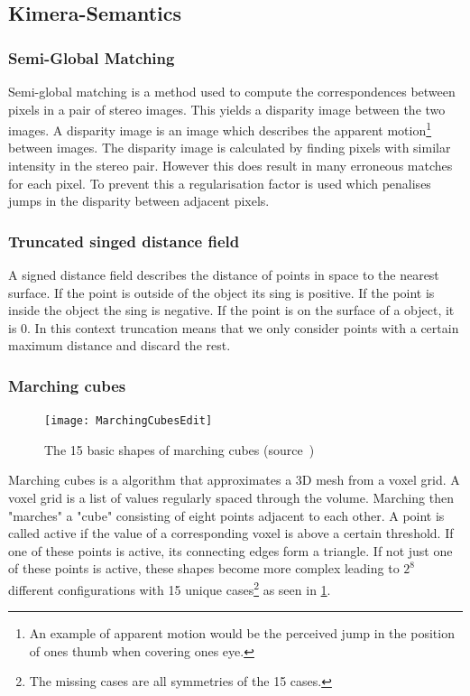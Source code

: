 \documentclass[11pt,a4paper]{article}
\begin{document}
\subsection{Kimera-Semantics}
\subsubsection{Semi-Global Matching} \label{pre:semi-global matching}
Semi-global matching is a method used  to compute the correspondences between pixels in a pair of stereo images. 
This yields a disparity image between the two images. 
A disparity image is an image which describes the apparent motion\footnote{An example of apparent motion would be the perceived jump in the position of ones thumb when covering ones eye.} between images.
The disparity image is calculated by finding pixels with similar intensity in the stereo pair. 
However this does result in many erroneous matches for each pixel. 
To prevent this a regularisation factor is used which penalises jumps in the disparity between adjacent pixels.
\subsubsection{Truncated singed distance field} \label{pre:TSDF}
A signed distance field describes the distance of points in space to the nearest surface.
If the point is outside of the object its sing is positive.
If the point is inside the object the sing is negative. 
If the point is on the surface of a object, it is 0. 
In this context truncation means that we only consider points with a certain maximum distance and discard the rest. 
\subsubsection{Marching cubes} \label{pre:marching cubes} 
\begin{figure}
  \centering
  \texttt{[image: MarchingCubesEdit]}
  \caption{The 15 basic shapes of marching cubes (source~\cite{marchingCubesImage})}\label{Fig:Marching cubes}  
\end{figure}
Marching cubes is a algorithm that approximates a 3D mesh from a voxel grid. 
A voxel grid is a list of values regularly spaced through the volume. 
Marching then "marches" a "cube" consisting of eight  points adjacent to each other.
A point is called active if the value of a corresponding voxel is above a certain threshold.
If one of these points is active, its connecting edges form a triangle. 
If not just one of these points is active, these shapes become more complex leading to $2^8$ different configurations with 15 unique cases\footnote{The missing cases are all symmetries of the 15 cases.} as seen in \ref{Fig:Marching cubes}.
\end{document}
